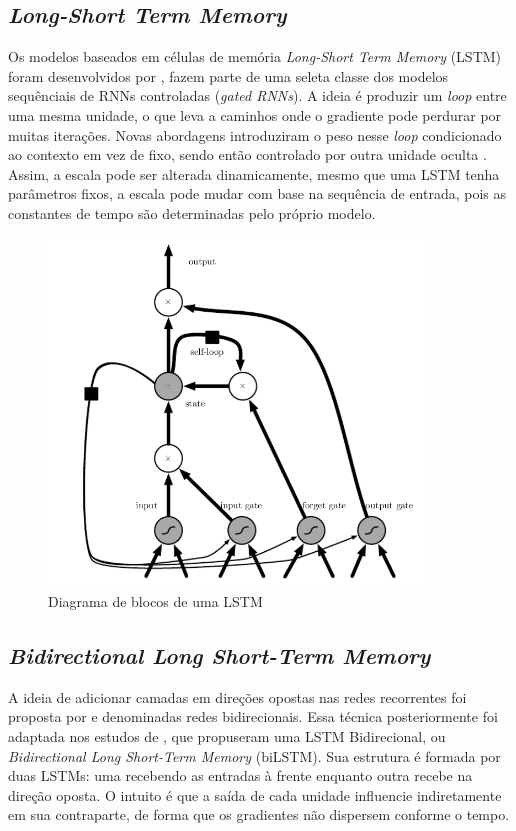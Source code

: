 \subsection{\textit{Long-Short Term Memory}} \label{sec:lstm}
Os modelos baseados em células de memória \textit{Long-Short Term Memory} (LSTM) foram desenvolvidos por \textcite{Hoch}, fazem parte de uma seleta classe dos modelos sequênciais de RNNs controladas (\textit{gated RNNs}).
A ideia é produzir um \textit{loop} entre uma mesma unidade, o que leva a caminhos onde o gradiente pode perdurar por muitas iterações.
Novas abordagens introduziram o peso nesse \textit{loop} condicionado ao contexto em vez de fixo, sendo então controlado por outra unidade oculta \cite{Gers}. 
Assim, a escala pode ser alterada dinamicamente, mesmo que uma LSTM tenha parâmetros fixos, a escala pode mudar com base na sequência 
de entrada, pois as constantes de tempo são determinadas pelo próprio modelo.

\begin{figure}[!htb] \centering
  \caption{Diagrama de blocos de uma LSTM} \label{figura:lstm}
  \begin{varwidth}{\linewidth}
    \includegraphics[width=10cm]{figuras/lstm.png}
  \end{varwidth}
\end{figure}

\subsection{\textit{Bidirectional Long Short-Term Memory}} \label{sec:bilstm}

A ideia de adicionar camadas em direções opostas nas redes recorrentes foi proposta por \textcite{Schuster} e denominadas redes bidirecionais.
Essa técnica posteriormente foi adaptada nos estudos de \textcite{bilstm}, que propuseram uma LSTM Bidirecional, ou \textit{Bidirectional Long Short-Term Memory} (biLSTM).
Sua estrutura é formada por duas LSTMs: 
uma recebendo as entradas à frente enquanto outra recebe na direção oposta.
O intuito é que a saída de cada unidade influencie indiretamente em sua contraparte, de forma que os gradientes não dispersem conforme o tempo.


